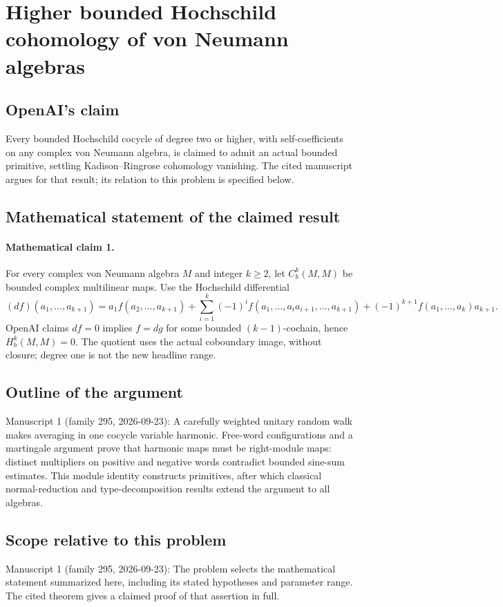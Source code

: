 \documentclass[11pt]{article}
\begin{document}
\section*{Higher bounded Hochschild cohomology of von Neumann algebras}

\subsection{OpenAI's claim}
Every bounded Hochschild cocycle of degree two or higher, with self-coefficients on any complex von Neumann algebra, is claimed to admit an actual bounded primitive, settling Kadison--Ringrose cohomology vanishing. The cited manuscript argues for that result; its relation to this problem is specified below.

\subsection{Mathematical statement of the claimed result}
\paragraph{Mathematical claim 1.} For every complex von Neumann algebra $M$ and integer $k\ge2$, let $C_b^k(M,M)$ be bounded complex multilinear maps. Use the Hochschild differential
\[
(df)(a_1,\ldots,a_{k+1})=a_1f(a_2,\ldots,a_{k+1})+\sum_{i=1}^k(-1)^if(a_1,\ldots,a_ia_{i+1},\ldots,a_{k+1})+(-1)^{k+1}f(a_1,\ldots,a_k)a_{k+1}.
\]
OpenAI claims $df=0$ implies $f=dg$ for some bounded $(k-1)$-cochain, hence $H_b^k(M,M)=0$. The quotient uses the actual coboundary image, without closure; degree one is not the new headline range.

\subsection{Outline of the argument}
Manuscript 1 (family 295, 2026-09-23): A carefully weighted unitary random walk makes averaging in one cocycle variable harmonic. Free-word configurations and a martingale argument prove that harmonic maps must be right-module maps: distinct multipliers on positive and negative words contradict bounded sine-sum estimates. This module identity constructs primitives, after which classical normal-reduction and type-decomposition results extend the argument to all algebras.

\subsection{Scope relative to this problem}
Manuscript 1 (family 295, 2026-09-23): The problem selects the mathematical statement summarized here, including its stated hypotheses and parameter range. The cited theorem gives a claimed proof of that assertion in full.
\end{document}
